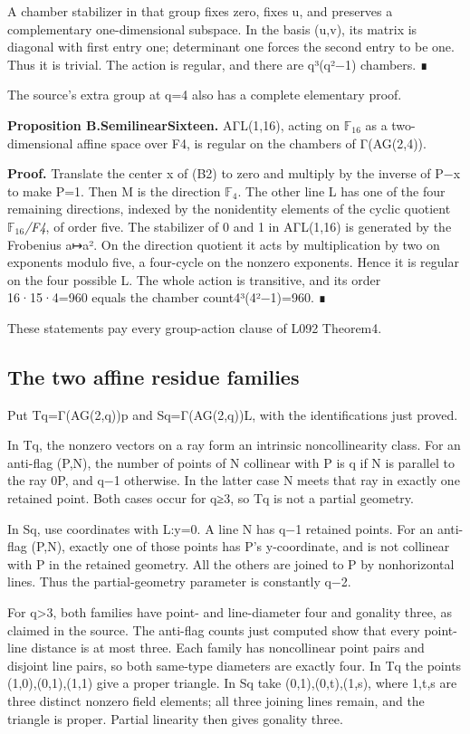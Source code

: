 A chamber stabilizer in that group fixes zero, fixes u, and preserves a
complementary one-dimensional subspace. In the basis (u,v), its matrix
is diagonal with first entry one; determinant one forces the second
entry to be one. Thus it is trivial. The action is regular, and there
are q³(q²−1) chambers. ∎

The source's extra group at q=4 also has a complete elementary proof.

\textbf{Proposition B.SemilinearSixteen.} AΓL(1,16), acting on \(\mathbb F_{16}\) as a
two-dimensional affine space over F4, is regular on the chambers of
Γ(AG(2,4)).

\textbf{Proof.} Translate the center x of (B2) to zero and multiply by
the inverse of P−x to make P=1. Then M is the direction \(\mathbb F_4\). The other
line L has one of the four remaining directions, indexed by the
nonidentity elements of the cyclic quotient \(\mathbb F_{16}\)\emph{/F4}, of order
five. The stabilizer of 0 and 1 in AΓL(1,16) is generated by the
Frobenius a↦a². On the direction quotient it acts by multiplication by
two on exponents modulo five, a four-cycle on the nonzero exponents.
Hence it is regular on the four possible L. The whole action is
transitive, and its order 16·15·4=960 equals the chamber
count4³(4²−1)=960. ∎

These statements pay every group-action clause of L092 Theorem4.

\subsection{The two affine residue
families}\label{the-two-affine-residue-families}

Put Tq=Γ(AG(2,q))p and Sq=Γ(AG(2,q))L, with the identifications just
proved.

In Tq, the nonzero vectors on a ray form an intrinsic noncollinearity
class. For an anti-flag (P,N), the number of points of N collinear with
P is q if N is parallel to the ray 0P, and q−1 otherwise. In the latter
case N meets that ray in exactly one retained point. Both cases occur
for q≥3, so Tq is not a partial geometry.

In Sq, use coordinates with L:y=0. A line N has q−1 retained points. For
an anti-flag (P,N), exactly one of those points has P's y-coordinate,
and is not collinear with P in the retained geometry. All the others are
joined to P by nonhorizontal lines. Thus the partial-geometry parameter
is constantly q−2.

For q\textgreater3, both families have point- and line-diameter four and
gonality three, as claimed in the source. The anti-flag counts just
computed show that every point-line distance is at most three. Each
family has noncollinear point pairs and disjoint line pairs, so both
same-type diameters are exactly four. In Tq the points (1,0),(0,1),(1,1)
give a proper triangle. In Sq take (0,1),(0,t),(1,s), where 1,t,s are
three distinct nonzero field elements; all three joining lines remain,
and the triangle is proper. Partial linearity then gives gonality three.

